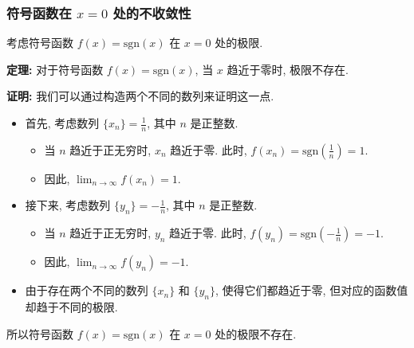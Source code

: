 \documentclass[
10pt, 
aspectratio=43, 
]{beamer}
\begin{document}
\begin{frame}
	\frametitle{符号函数在 $x=0$ 处的不收敛性}
	
	考虑符号函数 $f(x) = \text{sgn}(x)$ 在 $x=0$ 处的极限. 
	
	\pause
	
	\textbf{定理: } 对于符号函数 $f(x) = \text{sgn}(x)$, 当 $x$ 趋近于零时, 极限不存在. 
	
	\pause
	
	\textbf{证明: } 
	我们可以通过构造两个不同的数列来证明这一点. 
	
	\pause
	\begin{itemize}
		\item 首先, 考虑数列 $\{x_n\} = \frac{1}{n}$, 其中 $n$ 是正整数. 
		      
		      \pause
		      \begin{itemize}
		      	\item 当 $n$ 趋近于正无穷时, $x_n$ 趋近于零. 此时, $f(x_n) = \text{sgn}\left(\frac{1}{n}\right) = 1$. 
		      	      
		      	      \pause
		      	      
		      	\item 因此, $\lim_{n \to \infty} f(x_n) = 1$. 
		      \end{itemize}
		      \pause
		      
		\item 接下来, 考虑数列 $\{y_n\} = -\frac{1}{n}$, 其中 $n$ 是正整数. 
		      \begin{itemize}
		      	\pause
		      	
		      	\item 当 $n$ 趋近于正无穷时, $y_n$ 趋近于零. 此时, $f(y_n) = \text{sgn}\left(-\frac{1}{n}\right) = -1$. 
		      	      
		      	      \pause
		      	      
		      	\item 因此, $\lim_{n \to \infty} f(y_n) = -1$. 
		      	      
		      \end{itemize}
		      
		      \pause
		      
		\item 由于存在两个不同的数列 $\{x_n\}$ 和 $\{y_n\}$, 使得它们都趋近于零, 但对应的函数值却趋于不同的极限.
		      
	\end{itemize}
	
	\pause
	
	所以符号函数 $f(x) = \text{sgn}(x)$ 在 $x=0$ 处的极限不存在. 
	
\end{frame}
\end{document}
